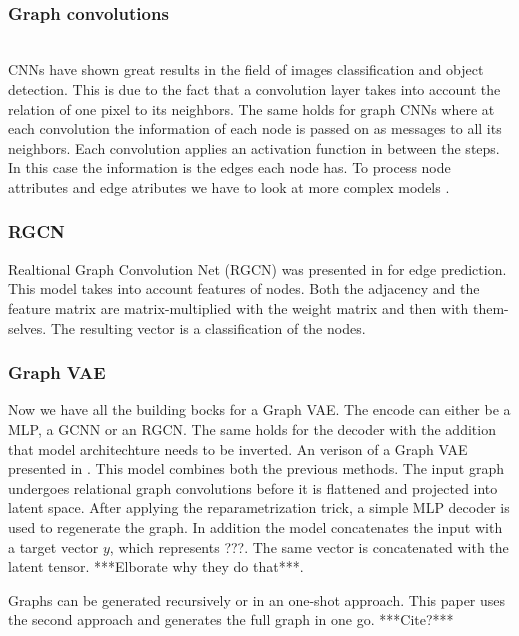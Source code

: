 \\
\subsubsection{Graph convolutions}\\
CNNs have shown great results in the field of images classification and object detection. This is due to the fact that a convolution layer takes into account the relation of one pixel to its neighbors. The same holds for graph CNNs where at each convolution the information of each node is passed on as messages to all its neighbors. Each convolution applies an activation function in between the steps. In this case the information is the edges each node has. To process node attributes and edge atributes we have to look at more complex models \cite{tiao_variational_nodate}. 
\\
\subsubsection{RGCN}
Realtional Graph Convolution Net (RGCN) was presented in \cite{kipf_semi-supervised_2017} for edge prediction. This model takes into account features of nodes. Both the adjacency and the feature matrix are matrix-multiplied with the weight matrix and then with them-selves. The resulting vector is a classification of the nodes.
\\
\subsubsection{Graph VAE}
Now we have all the building bocks for a Graph VAE. The encode can either be a MLP, a GCNN or an RGCN. The same holds for the decoder with the addition that model architechture needs to be inverted. An verison of a Graph VAE presented in \cite{simonovsky_graphvae_2018}. This model combines both the previous methods. The input graph undergoes relational graph convolutions before it is flattened and projected into latent space. After applying the reparametrization trick, a simple MLP decoder is used to regenerate the graph. In addition the model concatenates the input with a target vector $y$, which represents ???. The same vector is concatenated with the latent tensor. ***Elborate why they do that***.

Graphs can be generated recursively or in an one-shot approach. This paper uses the second approach and generates the full graph in one go. ***Cite?***

